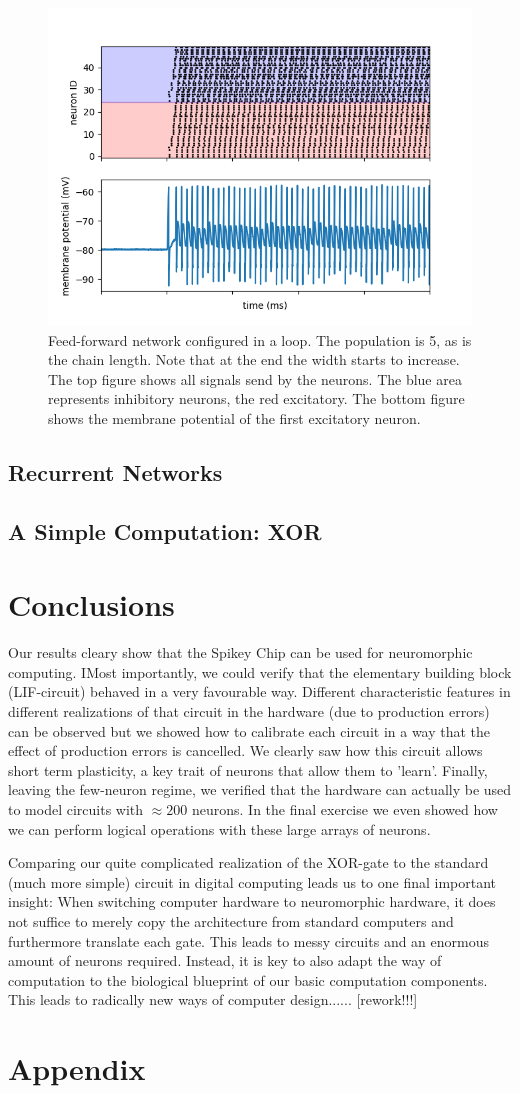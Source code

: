 \documentclass[a4paper,twocolumn]{article}
\begin{document}
\begin{figure}
    \centering
    \includegraphics[width=.5\textwidth]{figures/feedforward signals loop.png}
    \caption{Feed-forward network configured in a loop. The population is 5, as
        is the chain length. Note that at the end the width starts to increase.
        The top figure shows all signals send by the neurons. The blue area
        represents inhibitory neurons, the red excitatory. The bottom figure
        shows the membrane potential of the first excitatory neuron.}
    \label{fig:feed-forward-loop}
\end{figure}

\subsection{Recurrent Networks}
\subsection{A Simple Computation: XOR}

\section{Conclusions}
Our results cleary show that the Spikey Chip can be used for neuromorphic computing.  IMost importantly,  we could verify that the elementary building block (LIF-circuit) behaved in a very favourable way.  Different characteristic features in different realizations of that circuit in the hardware (due to production errors) can be observed but we showed how to calibrate each circuit in a way that the effect of production errors is cancelled.  We clearly saw how this circuit allows short term plasticity,  a key trait of neurons that allow them to 'learn'.  Finally,  leaving the few-neuron regime,  we verified that the hardware can actually be used to model circuits with $\approx 200$ neurons.  In the final exercise we even showed how we can perform logical operations with these large arrays of neurons.\par
Comparing our quite complicated realization of the XOR-gate to the standard (much more simple) circuit in digital computing leads us to one final important insight: When switching computer hardware to neuromorphic hardware, it does not suffice to merely copy the architecture from standard computers and furthermore translate each gate.  This leads to messy circuits and an enormous amount of neurons required.  Instead,  it is key to also adapt the way of computation to the biological blueprint of our basic computation components.  This leads to radically new ways of computer design...... [rework!!!]





\section{Appendix}
\end{document}
